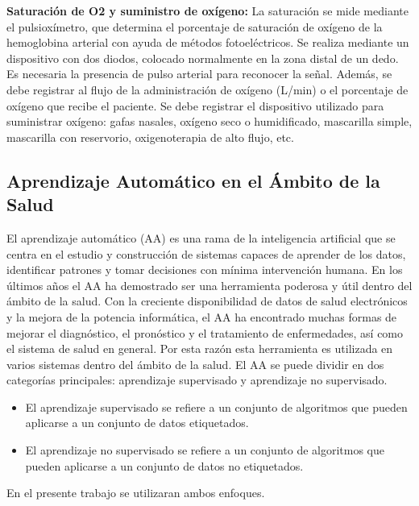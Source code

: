 \textbf{Saturación de O2 y suministro de oxígeno:} La saturación se mide mediante el pulsioxímetro, que determina el porcentaje de saturación de oxígeno de la hemoglobina arterial con ayuda de métodos fotoeléctricos. Se realiza mediante un dispositivo con dos diodos, colocado normalmente en la zona distal de un dedo. Es necesaria la presencia de pulso arterial para reconocer la señal. Además, se debe registrar al flujo de la administración de oxígeno (L/min) o el porcentaje de oxígeno que recibe el paciente.  Se debe registrar el dispositivo utilizado para suministrar oxígeno: gafas nasales, oxígeno seco o humidificado, mascarilla simple, mascarilla con reservorio, oxigenoterapia de alto flujo, etc. 


\subsection{Aprendizaje Automático en el Ámbito de la Salud}

El aprendizaje automático (AA) es una rama de la inteligencia artificial que se centra en el estudio y construcción de sistemas capaces de aprender de los datos, identificar patrones y tomar decisiones con mínima intervención humana. En los últimos años el AA ha demostrado ser una herramienta poderosa y útil dentro del ámbito de la salud. Con la creciente disponibilidad de datos de salud electrónicos y la mejora de la potencia informática, el AA ha encontrado muchas formas de mejorar el diagnóstico, el pronóstico y el tratamiento de enfermedades, así como el sistema de salud en general. Por esta razón esta herramienta es utilizada en varios sistemas dentro del ámbito de la salud. El AA se puede dividir en dos categorías principales: aprendizaje supervisado y aprendizaje no supervisado.

\begin{itemize}
    \item El aprendizaje supervisado se refiere a un conjunto de algoritmos que pueden aplicarse a un conjunto de datos etiquetados. 
    \item El aprendizaje no supervisado se refiere a un conjunto de algoritmos que pueden aplicarse a un conjunto de datos no etiquetados.
\end{itemize}

En el presente trabajo se utilizaran ambos enfoques.











